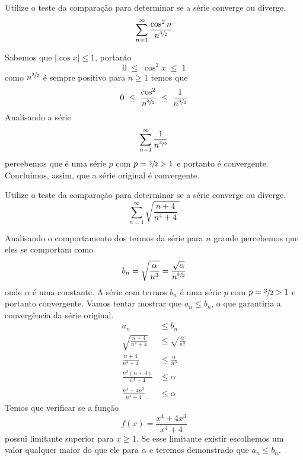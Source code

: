 \begin{exercises}

\begin{exercise}
Utilize o teste da comparação para determinar se a série converge ou diverge.
\[
  \sum_{n=1}^{\infty} \frac{\cos^2 n}{n^{\sfrac{3}{2}}}
\]
\begin{answer}
  Sabemos que $|\cos x|\leq 1$, portanto
  \[0 \;\leq\;\cos^2 x \;\leq\; 1\]
  como $n^{\sfrac{3}{2}}$ é sempre positivo para $n\geq 1$
  temos que
  \[ 0 \;\leq\; \frac{\cos^2}{n^{\sfrac{3}{2}}} \;\leq\; \frac{1}{n^{\sfrac{3}{2}}} \]
  Analisando a série
  \[ \sum_{n=1}^{\infty} \frac{1}{n^{\sfrac{3}{2}}} \]
  percebemos que é uma série $p$ com $p=\sfrac{3}{2}>1$ e portanto é convergente.
  Concluímos, assim, que a série original é convergente.
\end{answer}
\end{exercise}

\begin{exercise}
Utilize o teste da comparação para determinar se a série converge ou diverge.
\[ \sum_{n=1}^{\infty} \sqrt{ \frac{n+4}{n^4+4} \;} \]
\begin{answer}
  Analisando o comportamento dos termos da série para $n$ grande percebemos que eles
  se comportam como
  \[ b_n = \sqrt{\frac{\alpha}{n^3}} = \frac{\sqrt{\alpha}}{n^{\sfrac{3}{2}}} \]
  onde $\alpha$ é uma constante. A série com termos $b_n$ é uma série $p$ com
  $p=\sfrac{3}{2}>1$ e portanto convergente.
  Vamos tentar mostrar que $a_n\leq b_n$, o que garantiria a convergência da série original.
  \begin{align*}
  	a_n                        & \leq b_n                       \\
  	\sqrt{ \frac{n+4}{n^4+4} } & \leq \sqrt{\frac{\alpha}{n^3}} \\[2mm]
  	\frac{n+4}{n^4+4}          & \leq \frac{\alpha}{n^3}        \\[2mm]
  	\frac{n^3(n+4)}{n^4+4}     & \leq \alpha                    \\[2mm]
  	\frac{n^4+4n^3}{n^4+4}     & \leq \alpha
  \end{align*}
  Temos que verificar se a função
  \[ f(x) = \frac{x^4+4x^3}{x^4+4} \]
  possui limitante superior para $x\geq 1$. Se esse limitante existir
  escolhemos um valor qualquer maior do que ele para $\alpha$ e
  teremos demonstrado que $a_n\leq b_n$.


\end{answer}
\end{exercise}
\end{exercises}
